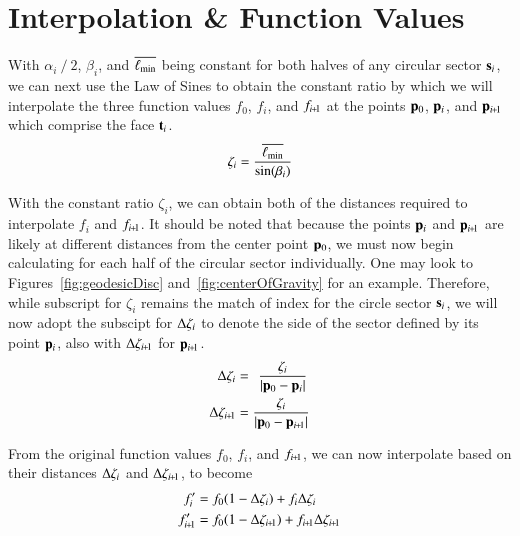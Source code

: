 %
%
%
%
%
\section{Interpolation \& Function Values}
\label{ch4sIFV}
With $\alpha_i\mathbin{/}2$, $\beta_i$, and $\overline{\ell_\text{min}}$ being constant for both halves of any circular sector $\mathbf{s}_i$, we can next use the Law of Sines to obtain the constant ratio by which we will interpolate the three function values $f_0$, $f_i$, and $f_{\sipo}$ at the points $\mathbf{p}_0$, $\mathbf{p}_i$, and $\bp_{\sipo}$ which comprise the face $\mathbf{t}_i$.
\begin{equation}
	\zeta_i = \frac{\overline{\ell_\text{min}}}{\sin(\beta_i)}
	\label{eq:zeta}
\end{equation}%
%

With the constant ratio $\zeta_i$, we can obtain both of the distances required to interpolate $f_i$ and $f_{\sipo}$. It should be noted that because the points $\mathbf{p}_i$ and $\bp_{\sipo}$ are likely at different distances from the center point $\mathbf{p}_0$, we must now begin calculating for each half of the circular sector individually. One may look to Figures~\ref{fig:geodesicDisc} and~\ref{fig:centerOfGravity} for an example. Therefore, while subscript for $\zeta_i$ remains the match of index for the circle sector $\mathbf{s}_i$, we will now adopt the subscipt for $\Delta\zeta_i$ to denote the side of the sector defined by its point $\mathbf{p}_i$, also with $\Dz_{\sipo}$ for $\bp_{\sipo}$.
\begin{align}
	\Dz_i & = \kern4pt\frac{\zeta_i}{|\bp_0 - \bp_i|}
	\label{eq:distanceIForInterpolation}\\
	\Dz_{\sipo} & = \frac{\zeta_i}{|\bp_0 - \bp_{\sipo}|}
	\label{eq:distanceIp1ForInterpolation}
\end{align}%
%

From the original function values $f_0$, $f_i$, and $f_{\sipo}$, we can now interpolate based on their distances $\Delta\zeta_i$ and $\Dz_{\sipo}$, to become
\begin{align}
	f'_i & = f_0(1 - \Dz_i) + f_i\Dz_i
	\label{eq:interpolatedFi} \\
	f'_{\sipo} & = f_0(1 - \Dz_{\sipo}) + f_{\sipo}\Dz_{\sipo}
	\label{eq:interpolatedFip1}
\end{align}%
%

